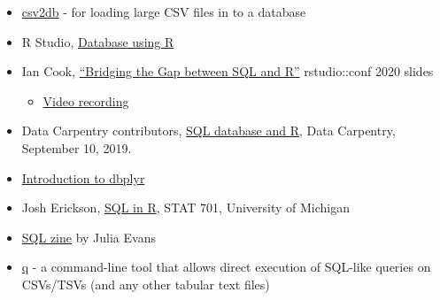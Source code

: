 \documentclass[
]{book}
\providecommand{\tightlist}{%
  \setlength{\itemsep}{0pt}\setlength{\parskip}{0pt}}
\begin{document}
\begin{itemize}
\tightlist
\item
  \href{https://github.com/csv2db/csv2db}{csv2db} - for loading large CSV files in to a database
\item
  R Studio, \href{https://db.rstudio.com/}{Database using R}
\item
  Ian Cook, \href{https://github.com/ianmcook/rstudioconf2020/blob/master/bridging_the_gap_between_sql_and_r.pdf}{``Bridging the Gap between SQL and R''} rstudio::conf 2020 slides

  \begin{itemize}
  \tightlist
  \item
    \href{https://www.youtube.com/watch?v=JwP5KdWSgqE\&ab_channel=RStudio}{Video recording}
  \end{itemize}
\item
  Data Carpentry contributors, \href{https://datacarpentry.org/R-ecology-lesson/05-r-and-databases.html}{SQL database and R}, Data Carpentry, September 10, 2019.
\item
  \href{https://cran.r-project.org/web/packages/dbplyr/vignettes/dbplyr.html}{Introduction to dbplyr}
\item
  Josh Erickson, \href{http://dept.stat.lsa.umich.edu/~jerrick/courses/stat701/notes/sql.html}{SQL in R}, STAT 701, University of Michigan
\item
  \href{https://wizardzines.com/zines/sql/}{SQL zine} by Julia Evans
\item
  \href{http://harelba.github.io/q/}{q} - a command-line tool that allows direct execution of SQL-like queries on CSVs/TSVs (and any other tabular text files)
\end{itemize}

  
\end{document}
